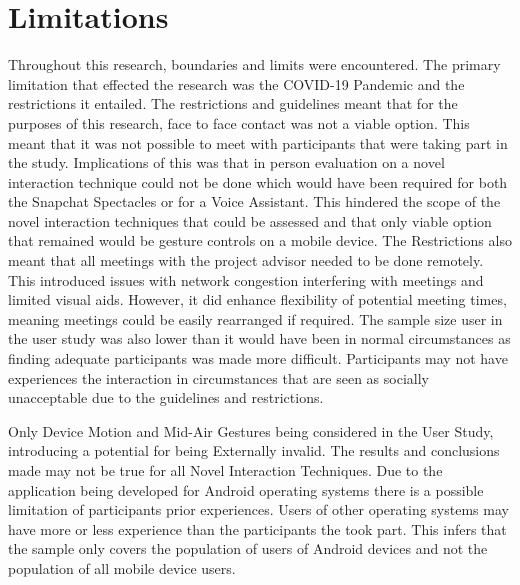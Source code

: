 \documentclass{l4proj}
\begin{document}
\section{Limitations}
Throughout this research, boundaries and limits were encountered. The primary limitation that effected the research was the COVID-19 Pandemic and the restrictions it entailed. The restrictions and guidelines meant that for the purposes of this research, face to face contact was not a viable option. This meant that it was not possible to meet with participants that were taking part in the study. Implications of this was that in person evaluation on a novel interaction technique could not be done which would have been required for both the Snapchat Spectacles or for a Voice Assistant. This hindered the scope of the novel interaction techniques that could be assessed and that only viable option that remained would be gesture controls on a mobile device. The Restrictions also meant that all meetings with the project advisor needed to be done remotely. This introduced issues with network congestion interfering with meetings and limited visual aids. However, it did enhance flexibility of potential meeting times, meaning meetings could be easily rearranged if required. The sample size user in the user study was also lower than it would have been in normal circumstances as finding adequate participants was made more difficult. Participants may not have experiences the interaction in circumstances that are seen as socially unacceptable due to the guidelines and restrictions.

Only Device Motion and Mid-Air Gestures being considered in the User Study, introducing a potential for being Externally invalid. The results and conclusions made may not be true for all Novel Interaction Techniques. Due to the application being developed for Android operating systems there is a possible limitation of participants prior experiences. Users of other operating systems may have more or less experience than the participants the took part. This infers that the sample only covers the population of users of Android devices and not the population of all mobile device users.
\end{document}
